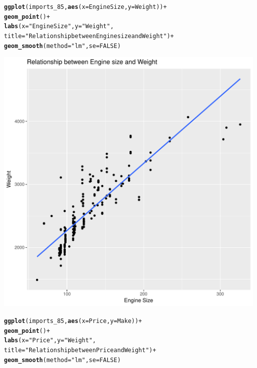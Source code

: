 \documentclass{article}\usepackage[]{graphicx}\usepackage[]{color}
\makeatletter
\def\maxwidth{ %
  \ifdim\Gin@nat@width>\linewidth
    \linewidth
  \else
    \Gin@nat@width
  \fi
}
\newcommand{\hlnum}[1]{\textcolor[rgb]{0.686,0.059,0.569}{#1}}%
\newcommand{\hlstr}[1]{\textcolor[rgb]{0.192,0.494,0.8}{#1}}%
\newcommand{\hlopt}[1]{\textcolor[rgb]{0,0,0}{#1}}%
\newcommand{\hlstd}[1]{\textcolor[rgb]{0.345,0.345,0.345}{#1}}%
\newcommand{\hlkwc}[1]{\textcolor[rgb]{0.333,0.667,0.333}{#1}}%
\newcommand{\hlkwd}[1]{\textcolor[rgb]{0.737,0.353,0.396}{\textbf{#1}}}%
\newenvironment{kframe}{%
 \def\at@end@of@kframe{}%
 \ifinner\ifhmode%
  \def\at@end@of@kframe{\end{minipage}}%
  \begin{minipage}{\columnwidth}%
 \fi\fi%
 \def\FrameCommand##1{\hskip\@totalleftmargin \hskip-\fboxsep
 \colorbox{shadecolor}{##1}\hskip-\fboxsep
     \hskip-\linewidth \hskip-\@totalleftmargin \hskip\columnwidth}%
 \MakeFramed {\advance\hsize-\width
   \@totalleftmargin\z@ \linewidth\hsize
   \@setminipage}}%
 {\par\unskip\endMakeFramed%
 \at@end@of@kframe}
\newenvironment{knitrout}{}{} %
\makeatother
\begin{document}
\begin{knitrout}
\begin{kframe}
\begin{alltt}
\hlkwd{ggplot}\hlstd{(imports_85,} \hlkwd{aes}\hlstd{(}\hlkwc{x} \hlstd{= EngineSize,} \hlkwc{y} \hlstd{= Weight))} \hlopt{+}
\hlkwd{geom_point}\hlstd{()} \hlopt{+}
\hlkwd{labs}\hlstd{(}\hlkwc{x} \hlstd{=} \hlstr{"Engine Size"}\hlstd{,} \hlkwc{y} \hlstd{=} \hlstr{"Weight"}\hlstd{,}
\hlkwc{title} \hlstd{=} \hlstr{"Relationship between Engine size and Weight"}\hlstd{)} \hlopt{+}
\hlkwd{geom_smooth}\hlstd{(}\hlkwc{method} \hlstd{=} \hlstr{"lm"}\hlstd{,} \hlkwc{se} \hlstd{=} \hlnum{FALSE}\hlstd{)}
\end{alltt}
\end{kframe}
\includegraphics[width=\maxwidth]{figure/unnamed-chunk-1-1} 
\begin{kframe}\begin{alltt}
\hlkwd{ggplot}\hlstd{(imports_85,} \hlkwd{aes}\hlstd{(}\hlkwc{x} \hlstd{= Price,} \hlkwc{y} \hlstd{= Make))} \hlopt{+}
\hlkwd{geom_point}\hlstd{()} \hlopt{+}
\hlkwd{labs}\hlstd{(}\hlkwc{x} \hlstd{=} \hlstr{"Price"}\hlstd{,} \hlkwc{y} \hlstd{=} \hlstr{"Weight"}\hlstd{,}
\hlkwc{title} \hlstd{=} \hlstr{"Relationship between Price and Weight"}\hlstd{)} \hlopt{+}
\hlkwd{geom_smooth}\hlstd{(}\hlkwc{method} \hlstd{=} \hlstr{"lm"}\hlstd{,} \hlkwc{se} \hlstd{=} \hlnum{FALSE}\hlstd{)}
\end{alltt}


{\ttfamily\noindent\color{warningcolor}{\#\# Warning: Removed 4 rows containing non-finite values (stat\_smooth).}}


\end{kframe}
\end{knitrout}
\end{document}
